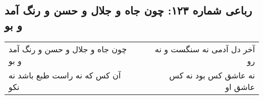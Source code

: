 \begin{center}
\section*{رباعی شماره ۱۲۳: چون جاه و جلال و حسن و رنگ آمد و بو}
\label{sec:123}
\begin{longtable}{l p{0.5cm} r}
چون جاه و جلال و حسن و رنگ آمد و بو
&&
آخر دل آدمی نه سنگست و نه رو
\\
آن کس که نه راست طبع باشد نه نکو
&&
نه عاشق کس بود نه کس عاشق او
\\
\end{longtable}
\end{center}
